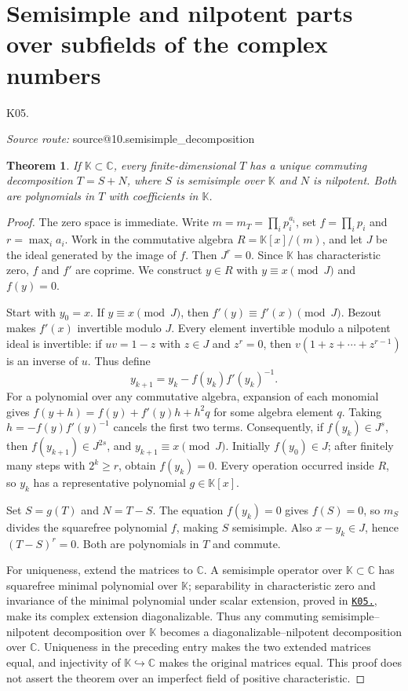 \documentclass[11pt,a4paper]{book}
\makeatletter
\newtheorem{theorem}{Theorem}[chapter]
\theoremstyle{definition}\newtheorem{definition}[theorem]{Definition}
\theoremstyle{remark}\newtheorem{remark}[theorem]{Remark}
\newcommand{\K}{\mathbb K}\newcommand{\R}{\mathbb R}\newcommand{\C}{\mathbb C}
\newcommand{\kref}[1]{\hyperref[k:#1]{\texttt{K05.\detokenize{#1}}}}
\newcommand{\Kentry}[2]{\section{#2}\label{k:#1}\noindent\textsf{\small K05.\detokenize{#1}}\par
  \begingroup\small\color{black!65}\textit{Source route: }\csname source@#1\endcsname\par\endgroup}
\makeatother
\begin{document}
\Kentry{10.semisimple_decomposition}{Semisimple and nilpotent parts over subfields of the complex numbers}
\begin{theorem}
If $\K\subset\C$, every finite-dimensional $T$ has a unique commuting decomposition $T=S+N$, where $S$ is semisimple over $\K$ and $N$ is nilpotent. Both are polynomials in $T$ with coefficients in $\K$.
\end{theorem}
\begin{proof}
The zero space is immediate. Write $m=m_T=\prod_i p_i^{a_i}$, set $f=\prod_i p_i$ and $r=\max_i a_i$. Work in the commutative algebra $R=\K[x]/(m)$, and let $J$ be the ideal generated by the image of $f$. Then $J^r=0$. Since $\K$ has characteristic zero, $f$ and $f'$ are coprime. We construct $y\in R$ with $y\equiv x\pmod J$ and $f(y)=0$.

Start with $y_0=x$. If $y\equiv x\pmod J$, then $f'(y)\equiv f'(x)\pmod J$. Bezout makes $f'(x)$ invertible modulo $J$. Every element invertible modulo a nilpotent ideal is invertible: if $uv=1-z$ with $z\in J$ and $z^r=0$, then $v(1+z+\cdots+z^{r-1})$ is an inverse of $u$. Thus define
\[y_{k+1}=y_k-f(y_k)f'(y_k)^{-1}.\]
For a polynomial over any commutative algebra, expansion of each monomial gives $f(y+h)=f(y)+f'(y)h+h^2q$ for some algebra element $q$. Taking $h=-f(y)f'(y)^{-1}$ cancels the first two terms. Consequently, if $f(y_k)\in J^s$, then $f(y_{k+1})\in J^{2s}$, and $y_{k+1}\equiv x\pmod J$. Initially $f(y_0)\in J$; after finitely many steps with $2^k\ge r$, obtain $f(y_k)=0$. Every operation occurred inside $R$, so $y_k$ has a representative polynomial $g\in\K[x]$.

Set $S=g(T)$ and $N=T-S$. The equation $f(y_k)=0$ gives $f(S)=0$, so $m_S$ divides the squarefree polynomial $f$, making $S$ semisimple. Also $x-y_k\in J$, hence $(T-S)^r=0$. Both are polynomials in $T$ and commute.

For uniqueness, extend the matrices to $\C$. A semisimple operator over $\K\subset\C$ has squarefree minimal polynomial over $\K$; separability in characteristic zero and invariance of the minimal polynomial under scalar extension, proved in \kref{10.semisimple}, make its complex extension diagonalizable. Thus any commuting semisimple--nilpotent decomposition over $\K$ becomes a diagonalizable--nilpotent decomposition over $\C$. Uniqueness in the preceding entry makes the two extended matrices equal, and injectivity of $\K\hookrightarrow\C$ makes the original matrices equal. This proof does not assert the theorem over an imperfect field of positive characteristic.
\end{proof}
\end{document}
